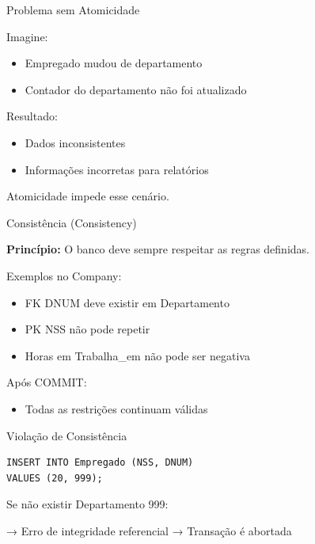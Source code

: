 \documentclass{beamer}
\begin{document}
\begin{frame}{Problema sem Atomicidade}

Imagine:

\begin{itemize}
    \item Empregado mudou de departamento
    \item Contador do departamento não foi atualizado
\end{itemize}

Resultado:
\begin{itemize}
    \item Dados inconsistentes
    \item Informações incorretas para relatórios
\end{itemize}

Atomicidade impede esse cenário.

\end{frame}







\begin{frame}{Consistência (Consistency)}

\textbf{Princípio:}
O banco deve sempre respeitar as regras definidas.

Exemplos no Company:

\begin{itemize}
    \item FK DNUM deve existir em Departamento
    \item PK NSS não pode repetir
    \item Horas em Trabalha\_em não pode ser negativa
\end{itemize}

Após COMMIT:
\begin{itemize}
    \item Todas as restrições continuam válidas
\end{itemize}

\end{frame}





\begin{frame}[fragile]{Violação de Consistência}

\begin{verbatim}
INSERT INTO Empregado (NSS, DNUM)
VALUES (20, 999);
\end{verbatim}

Se não existir Departamento 999:

→ Erro de integridade referencial  
→ Transação é abortada

\end{frame}
\end{document}
